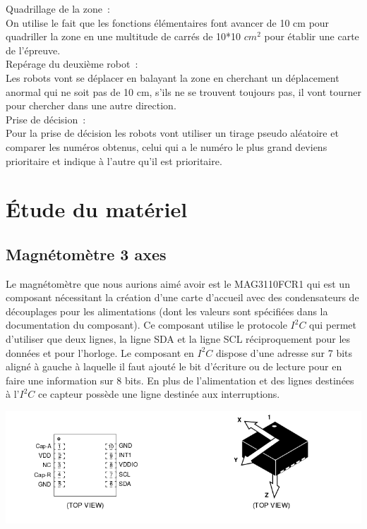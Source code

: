 \documentclass{article}
\begin{document}
Quadrillage de la zone~:\\

On utilise le fait que les fonctions élémentaires font avancer de 10 cm pour quadriller la zone en une multitude de carrés de 10*10 $cm^2$ pour établir une carte de l’épreuve. \\

Repérage du deuxième robot~: \\

Les robots vont se déplacer en balayant la zone en cherchant un déplacement anormal qui ne soit pas de 10 cm, s’ils ne se trouvent toujours pas, il vont tourner pour chercher dans une autre direction. \\

Prise de décision~: \\

Pour la prise de décision les robots vont utiliser un tirage pseudo aléatoire et comparer les numéros obtenus, celui qui a le numéro le plus grand deviens prioritaire et indique à l’autre qu’il est prioritaire.

\section{Étude du matériel}

\subsection{Magnétomètre 3 axes}

Le magnétomètre que nous aurions aimé avoir est le MAG3110FCR1 qui est un composant nécessitant la création d'une carte d’accueil avec des condensateurs de découplages pour les alimentations (dont les valeurs sont spécifiées dans la documentation du composant). Ce composant utilise le protocole $I^2C$ qui permet d'utiliser que deux lignes, la ligne SDA et la ligne SCL réciproquement pour les données et pour l'horloge. Le composant en $I^2C$ dispose d'une adresse sur 7 bits aligné à gauche à laquelle il faut ajouté le bit d'écriture ou de lecture pour en faire une information sur 8 bits. En plus de l'alimentation et des lignes destinées à l'$I^2C$ ce capteur possède une ligne destinée aux interruptions.

\begin{center}
  \includegraphics[width=17cm]{mag_schematic.png}
\end{center}
\end{document}

